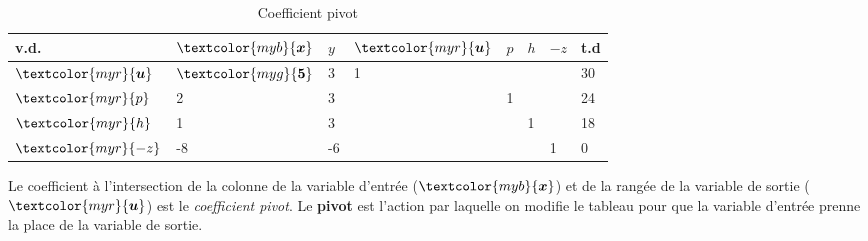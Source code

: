 \documentclass{report}
\begin{document}
\begin{multicols*}{2}
        \begin{table}[H]
                \begin{center}
                    \renewcommand{\arraystretch}{1.5}
                    \selectfont
                    \footnotesize
                        \begin{tabular}{|l|l l l l l |l|l|}
                        \arrayrulecolor{blue}
                        \hline
                        v.d. & $\textcolor{myb}{\boldsymbol{x}}$
                             & $y$ & $\textcolor{myr}{\boldsymbol{u}}$ & $p$ & $h$ & $-z$ & t.d 
                        \\
                        \hline
                        \arrayrulecolor{black}
                        $\textcolor{myr}{\boldsymbol{u}} 
                        $     & \cellcolor{myg!40} $\textcolor{myg}{\boldsymbol{5}}$ 
                                & 3
                                & 1
                                & 
                                & &  &  30
                        \\
                        $\textcolor{myr}{p} $     
                               & 2
                               & 3
                               & & 1
                               & & & 24 
                        \\
                        $\textcolor{myr}{h} $     
                               & 1
                               & 3 
                               &  & 
                               &  1
                               & & 18 
                        \\ 
                        \hline
                        $\textcolor{myr}{-z}$ 
                               & -8
                                & -6
                                & 
                                & 
                                & 
                                & 1 & 0 
                        \\
                        \hline 



                        \end{tabular}
                \end{center}
        \caption{Coefficient pivot}
        \end{table}

    Le coefficient à l'intersection de la colonne de la variable d'entrée 
    ($\textcolor{myb}{\boldsymbol{x}}$) et de la rangée de la variable de sortie 
    ($\textcolor{myr}{\boldsymbol{u}}$) est le \textcolor{myg}{\textit{coefficient pivot}}. 
    Le \textbf{pivot} est l'action par laquelle on modifie le tableau pour que la variable 
    d'entrée prenne la place de la variable de sortie. 



\end{multicols*}
\end{document}
